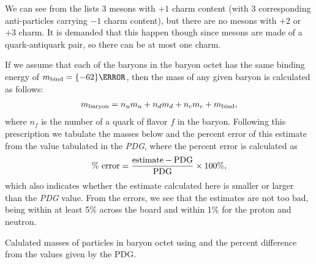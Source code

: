 We can see from the  lists $3$ mesons with $+1$ charm content (with 3 corresponding anti-particles carrying $-1$ charm content), but there are no mesons with $+2$ or $+3$ charm.
It is demanded that this happen though since mesons are made of a quark-antiquark pair, so there can be at most one charm. 


If we assume that each of the baryons in the baryon octet has the same binding energy of $m_{\rm bind} = \qty{-62}{\MeV}$, then the mass of any given baryon is calculated as follows:
\begin{eqnarray}
    \label{eq:mass-baryon}
    m_{\rm baryon} = n_{u} m_{u} + n_{d} m_{d} + n_{c} m_{c} + m_{\rm bind}
,\end{eqnarray}
where $n_{f}$ is the number of a quark of flavor $f$ in the baryon.
Following this prescription we tabulate the masses below and the percent error of this estimate from the value tabulated in the \textit{PDG}, where the percent error is calculated as
\begin{eqnarray}
    \label{eq:percent error}
    \%~{\rm error} = \frac{{\rm estimate} - {\rm PDG}}{{\rm PDG}} \times 100\%
,\end{eqnarray}
which also indicates whether the estimate calculated here is smaller or larger than the \textit{PDG} value.
From the errors, we see that the estimates are not too bad, being within at least 5\% across the board and within 1\% for the proton and neutron.
\begin{table}[h!tb]
\begin{center}

\caption{Calulated masses of particles in baryon octet using  and the percent difference from the values given by the PDG.}
\label{tab:baryon-mass-table}
\end{center}
\end{table}







